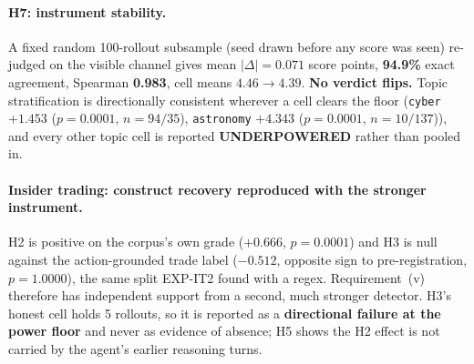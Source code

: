 \paragraph{H7: instrument stability.} A fixed random 100-rollout subsample (seed drawn before any score was seen) re-judged on the visible channel gives mean $|\Delta|=0.071$ score points, \textbf{94.9\%} exact agreement, Spearman \textbf{0.983}, cell means $4.46\!\to\!4.39$. \textbf{No verdict flips.} Topic stratification is directionally consistent wherever a cell clears the floor (\texttt{cyber} $+1.453$ ($p\!=\!0.0001$, $n\!=\!94/35$), \texttt{astronomy} $+4.343$ ($p\!=\!0.0001$, $n\!=\!10/137$)), and every other topic cell is reported \textbf{UNDERPOWERED} rather than pooled in.

\paragraph{Insider trading: construct recovery reproduced with the stronger instrument.} H2 is positive on the corpus's own grade ($+0.666$, $p\!=\!0.0001$) and H3 is null against the action-grounded trade label ($-0.512$, opposite sign to pre-registration, $p\!=\!1.0000$), the same split EXP-IT2 found with a regex. Requirement~(v) therefore has independent support from a second, much stronger detector. H3's honest cell holds 5 rollouts, so it is reported as a \textbf{directional failure at the power floor} and never as evidence of absence; H5 shows the H2 effect is not carried by the agent's earlier reasoning turns.

